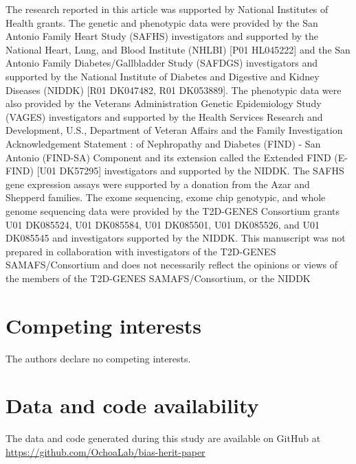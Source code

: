 \documentclass[11pt]{article}
\begin{document}
The research reported in this article was supported by National Institutes of Health grants. The genetic and phenotypic data were provided by the San Antonio Family Heart Study (SAFHS) investigators and supported by the National Heart, Lung, and Blood Institute (NHLBI) [P01 HL045222] and the San Antonio Family Diabetes/Gallbladder Study (SAFDGS) investigators and supported by the National Institute of Diabetes and Digestive and Kidney Diseases (NIDDK) [R01 DK047482, R01 DK053889]. The phenotypic data were also provided by the Veterans Administration Genetic Epidemiology Study (VAGES) investigators and supported by the Health Services Research and Development, U.S., Department of Veteran Affairs and the Family Investigation Acknowledgement Statement : of Nephropathy and Diabetes (FIND) - San Antonio (FIND-SA) Component and its extension called the Extended FIND (E-FIND) [U01 DK57295] investigators and supported by the NIDDK. The SAFHS gene expression assays were supported by a donation from the Azar and Shepperd families. The exome sequencing, exome chip genotypic, and whole genome sequencing data were provided by the T2D-GENES Consortium grants U01 DK085524, U01 DK085584, U01 DK085501, U01 DK085526, and U01 DK085545 and investigators supported by the NIDDK. This manuscript was not prepared in collaboration with investigators of the T2D-GENES SAMAFS/Consortium and does not necessarily reflect the opinions or views of the members of the T2D-GENES SAMAFS/Consortium, or the NIDDK

\section*{Competing interests}
The authors declare no competing interests.

\section*{Data and code availability}

The data and code generated during this study are available on GitHub at \url{https://github.com/OchoaLab/bias-herit-paper}



\newpage

\printbibliography

\newpage
\end{document}
